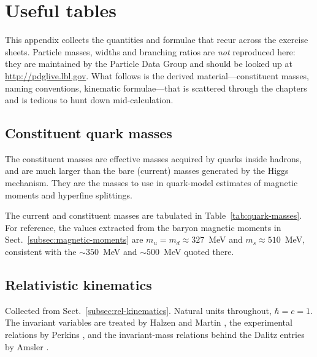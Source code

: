 \appendix

\section{Useful tables}\label{app:useful-tables}

This appendix collects the quantities and formulae that recur across the exercise
sheets. Particle masses, widths and branching ratios are \emph{not} reproduced here:
they are maintained by the Particle Data Group and should be looked up at
\url{http://pdglive.lbl.gov}. What follows is the derived material---constituent masses,
naming conventions, kinematic formulae---that is scattered through the chapters and is
tedious to hunt down mid-calculation.

\subsection{Constituent quark masses}
\label{app:quark-masses}

The constituent masses are effective masses acquired by quarks inside hadrons, and are
much larger than the bare (current) masses generated by the Higgs mechanism. They are the
masses to use in quark-model estimates of magnetic moments and hyperfine splittings.

The current and constituent masses are tabulated in Table~\ref{tab:quark-masses}.
For reference, the values extracted from the baryon magnetic moments in
Sect.~\ref{subsec:magnetic-moments} are $m_u = m_d \approx 327$~MeV and
$m_s \approx 510$~MeV, consistent with the $\sim 350$~MeV and $\sim 500$~MeV
quoted there.

\subsection{Relativistic kinematics}
\label{app:kinematics}

Collected from Sect.~\ref{subsec:rel-kinematics}. Natural units throughout,
$\hbar = c = 1$. The invariant variables are treated by Halzen and Martin
\cite[Ch.~4]{HalzenMartin1984}, the experimental relations by Perkins
\cite[Ch.~2]{Perkins2000}, and the invariant-mass relations behind the Dalitz entries by
Amsler \cite[App.~B]{Amsler2018}.

